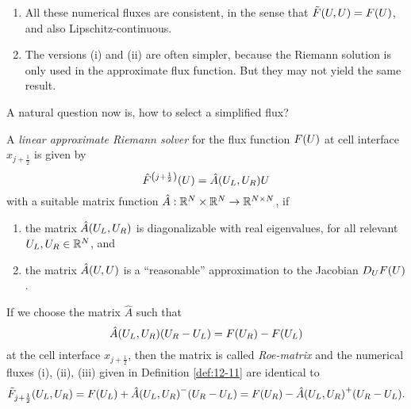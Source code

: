 \begin{remark}
	\begin{enumerate}
		\item All these numerical fluxes are consistent, in the sense that \(\tilde{F}\parentheses*{U, U} = F\parentheses*{U}\), and also Lipschitz-continuous.
		\item The versions (i) and (ii) are often simpler, because the Riemann solution is only used in the approximate flux function.
		But they may not yield the same result.
	\end{enumerate}
\end{remark}

A natural question now is, how to select a simplified flux?

\begin{definition}
	A \emph{linear approximate Riemann solver} for the flux function \(F\parentheses*{U}\) at cell interface \(x_{j + \frac{1}{2}}\) is given by
	\[
		\hat{F}^{\parentheses*{j + \frac{1}{2}}}\parentheses*{U} = \hat{A}\parentheses*{U_L, U_R}U
	\]
	with a suitable matrix function \(\hat{A}: \mathbb{R}^N \times \mathbb{R}^N \to \mathbb{R}^{N \times N}\), if
	\begin{enumerate}
		\item the matrix \(\hat{A}\parentheses*{U_L, U_R}\) is diagonalizable with real eigenvalues, for all relevant \(U_L, U_R \in \mathbb{R}^N\), and
		\item the matrix \(\hat{A}\parentheses*{U, U}\) is a ``reasonable'' approximation to the Jacobian \(D_U F\parentheses*{U}\).
	\end{enumerate}
\end{definition}

\begin{theorem}
	If we choose the matrix \(\hat{A}\) such that
	\[
		\hat{A}\parentheses*{U_L, U_R}\parentheses*{U_R - U_L} = F\parentheses*{U_R} - F\parentheses*{U_L}
	\]
	at the cell interface \(x_{j + \frac{1}{2}}\), then the matrix is called \emph{Roe-matrix} and the numerical fluxes (i), (ii), (iii) given in Definition \ref{def:12-11} are identical to
	\[
		\tilde{F}_{j + \frac{1}{2}}\parentheses*{U_L, U_R} = F\parentheses*{U_L} + \hat{A}\parentheses*{U_L, U_R}^- \parentheses*{U_R - U_L} = F\parentheses*{U_R} - \hat{A}\parentheses*{U_L, U_R}^+ \parentheses*{U_R - U_L}.
	\]
\end{theorem}

